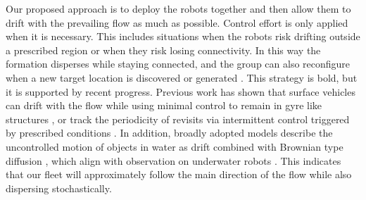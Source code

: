 \documentclass[conference]{IEEEconf}
\theoremstyle{plain}
\begin{document}



Our proposed approach is to deploy the robots together and then allow them to drift with the prevailing flow as much as possible. Control effort is only applied when it is necessary. This includes situations when the robots risk drifting outside a prescribed region or when they risk losing connectivity. In this way the formation disperses while staying connected, and the group can also reconfigure when a new target location is discovered or generated \cite{butler2025}. This strategy is bold, but it is supported by recent progress. Previous work has shown that surface vehicles can drift with the flow while using minimal control to remain in gyre like structures \cite{wei2019}, or track the periodicity of revisits via intermittent control triggered by prescribed conditions \cite{knizhnik2022}. In addition, broadly adopted models describe the uncontrolled motion of objects in water as drift combined with Brownian type diffusion \cite{taylor1922, okubo1971, majda1999}, which align with observation on underwater robots \cite{berlinger2021, quattrini2023}. This indicates that our fleet will approximately follow the main direction of the flow while also dispersing stochastically.
\end{document}
